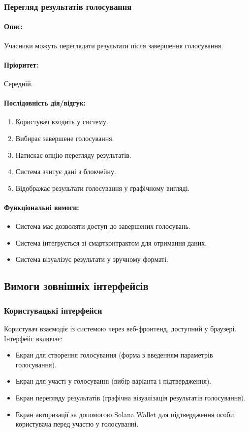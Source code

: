 \documentclass[14pt]{extreport}
\newcounter{req}[subsubsection]
\newcommand\req{\arabic{req}\stepcounter{req}}
\begin{document}
  \subsubsection{Перегляд результатів голосування}  
  \paragraph{Опис:} Учасники можуть переглядати результати після завершення голосування.  
  \paragraph{Пріоритет:} Середній.  
  \paragraph{Послідовність дія/відгук:}  
  \begin{enumerate}  
      \item Користувач входить у систему.  
      \item Вибирає завершене голосування.  
      \item Натискає опцію перегляду результатів.  
      \item Система зчитує дані з блокчейну.  
      \item Відображає результати голосування у графічному вигляді.  
  \end{enumerate}  
  \paragraph{Функціональні вимоги:}  
  \begin{itemize}[leftmargin=*,label=REQ-.\req:]  
      \item Система має дозволяти доступ до завершених голосувань.  
      \item Система інтегрується зі смартконтрактом для отримання даних.  
      \item Система візуалізує результати у зручному форматі.  
  \end{itemize}  

  \subsection{Вимоги зовнішніх інтерфейсів}
  \subsubsection{Користувацькі інтерфейси}
  Користувач взаємодіє із системою через веб-фронтенд, доступний у браузері. Інтерфейс включає:
  \begin{itemize}
    \item Екран для створення голосування (форма з введенням параметрів голосування).
    \item Екран для участі у голосуванні (вибір варіанта і підтвердження).
    \item Екран перегляду результатів (графічна візуалізація результатів голосування).
    \item Екран авторизації за допомогою Solana Wallet для підтвердження особи користувача перед участю у голосуванні.
  \end{itemize}
  
\end{document}
